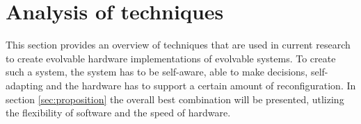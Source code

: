 \section{Analysis of techniques}
\label{sec:technique}

This section provides an overview of techniques that are used in current research to create evolvable hardware implementations of evolvable systems. To create such a system, the system has to be self-aware, able to make decisions, self-adapting and the hardware has to support a certain amount of reconfiguration. In section \ref{sec:proposition} the overall best combination will be presented, utlizing the flexibility of software and the speed of hardware.









